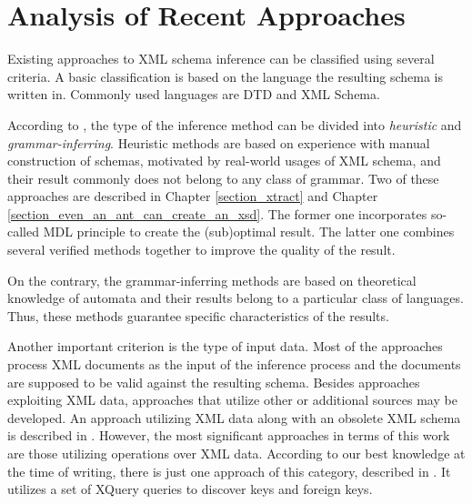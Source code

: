 \chapter{Analysis of Recent Approaches} \label{chapter_analysis_of_recent_approaches}
Existing approaches to XML schema inference can be classified using several criteria. A basic classification is based on the language the resulting schema is written in. Commonly used languages are DTD and XML Schema.

According to \cite{Mlynkova:2008:AAX:1494650.1495496}, the type of the inference method can be divided into \emph{heuristic} and \emph{grammar-inferring}. Heuristic methods \cite{Chidlovskii:2002:SEX:544220.544288, Garofalakis:2000:XSE:342009.335409, Moh:2000:RSW:336597.336638, Wong03onstructural, Vosta:2008:EAC:1802514.1802522} are based on experience with manual construction of schemas, motivated by real-world usages of XML schema, and their result commonly does not belong to any class of grammar. Two of these approaches are described in Chapter \ref{section_xtract} and Chapter \ref{section_even_an_ant_can_create_an_xsd}. The former one incorporates so-called MDL principle to create the (sub)optimal result. The latter one combines several verified methods together to improve the quality of the result.

On the contrary, the grammar-inferring methods \cite{ahonen, Bex:2006:ICD:1182635.1164139, Bex:2007:IXS:1325851.1325964, Hegewald:2006:XES:1129755.1130124, Min:2003:EES:639473.639475, Fernau:2001:LXG:645744.667236} are based on theoretical knowledge of automata and their results belong to a particular class of languages. Thus, these methods guarantee specific characteristics of the results.

Another important criterion is the type of input data. Most of the approaches process XML documents as the input of the inference process and the documents are supposed to be valid against the resulting schema. Besides approaches exploiting XML data, approaches that utilize other or additional sources may be developed. An approach utilizing XML data along with an obsolete XML schema is described in \cite{Mlynkova:2009:IXS:1862681.1862693}. However, the most significant approaches in terms of this work are those utilizing operations over XML data. According to our best knowledge at the time of writing, there is just one approach of this category, described in \cite{Necasky:2009:DXK:1529282.1529414}. It utilizes a set of XQuery queries to discover keys and foreign keys.

